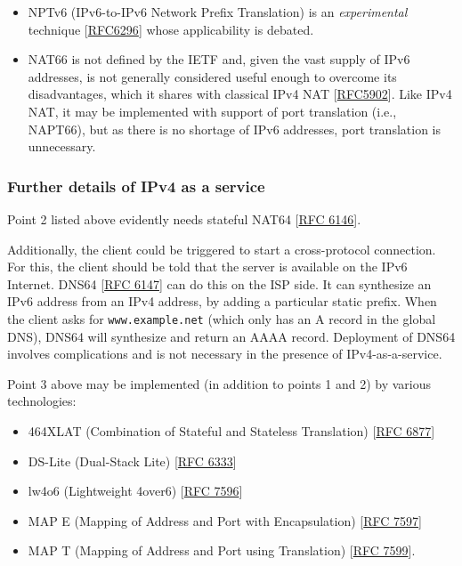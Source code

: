\documentclass[
]{article}
\providecommand{\tightlist}{%
  \setlength{\itemsep}{0pt}\setlength{\parskip}{0pt}}
\begin{document}
\begin{itemize}
  \begin{itemize}
  \item
    NPTv6 (IPv6-to-IPv6 Network Prefix Translation) is an
    \emph{experimental} technique
    {[}\href{https://www.rfc-editor.org/info/rfc6296}{RFC6296}{]} whose
    applicability is debated.
  \item
    NAT66 is not defined by the IETF and, given the vast supply of IPv6
    addresses, is not generally considered useful enough to overcome its
    disadvantages, which it shares with classical IPv4 NAT
    {[}\href{https://www.rfc-editor.org/info/rfc5902}{RFC5902}{]}. Like
    IPv4 NAT, it may be implemented with support of port translation
    (i.e., NAPT66), but as there is no shortage of IPv6 addresses, port
    translation is unnecessary.
  \end{itemize}
\end{itemize}

\subsubsection{Further details of IPv4 as a
service}\label{further-details-of-ipv4-as-a-service}

Point 2 listed above evidently needs stateful NAT64
{[}\href{https://www.rfc-editor.org/info/rfc6146}{RFC 6146}{]}.

Additionally, the client could be triggered to start a cross-protocol
connection. For this, the client should be told that the server is
available on the IPv6 Internet. DNS64
{[}\href{https://www.rfc-editor.org/info/rfc6147}{RFC 6147}{]} can do
this on the ISP side. It can synthesize an IPv6 address from an IPv4
address, by adding a particular static prefix. When the client asks for
\texttt{www.example.net} (which only has an A record in the global DNS),
DNS64 will synthesize and return an AAAA record. Deployment of DNS64
involves complications and is not necessary in the presence of
IPv4-as-a-service.

Point 3 above may be implemented (in addition to points 1 and 2) by
various technologies:

\begin{itemize}
\tightlist
\item
  464XLAT (Combination of Stateful and Stateless Translation)
  {[}\href{https://www.rfc-editor.org/info/rfc6877}{RFC 6877}{]}
\item
  DS-Lite (Dual-Stack Lite)
  {[}\href{https://www.rfc-editor.org/info/rfc6333}{RFC 6333}{]}
\item
  lw4o6 (Lightweight 4over6)
  {[}\href{https://www.rfc-editor.org/info/rfc7596}{RFC 7596}{]}
\item
  MAP E (Mapping of Address and Port with Encapsulation)
  {[}\href{https://www.rfc-editor.org/info/rfc7597}{RFC 7597}{]}
\item
  MAP T (Mapping of Address and Port using Translation)
  {[}\href{https://www.rfc-editor.org/info/rfc7599}{RFC 7599}{]}.
\end{itemize}
\end{document}
